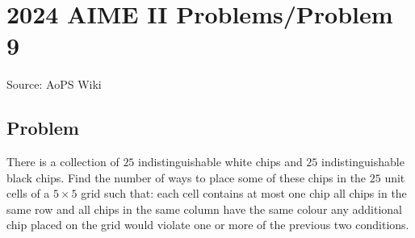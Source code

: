 \documentclass[12pt]{article}
\begin{document}
\section*{{2024 AIME II Problems/Problem 9}}
Source: AoPS Wiki

\subsection*{Problem}
There is a collection of $25$ indistinguishable white chips and $25$ indistinguishable black chips. Find the number of ways to place some of these chips in the $25$ unit cells of a $5\times5$ grid such that: each cell contains at most one chip all chips in the same row and all chips in the same column have the same colour any additional chip placed on the grid would violate one or more of the previous two conditions.
\end{document}
